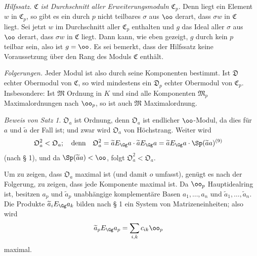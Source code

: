 \medskip
\noindent\emph{Hilfssatz. $\mathfrak C$ ist Durchschnitt aller Erweiterungsmoduln $\mathfrak C_p$.} Denn liegt ein Element $w$ in $\mathfrak C_p$, so gibt es ein durch $p$ nicht teilbares $\sigma$ aus $\oo$ derart, dass $\sigma w$ in $\mathfrak C$ liegt. Sei jetzt $w$ im Durchschnitt aller $\mathfrak C_p$ enthalten und $g$ das Ideal aller $\sigma$ aus $\oo$ derart, dass $\sigma w$ in $\mathfrak C$ liegt. Dann kann, wie eben gezeigt, $g$ durch kein $p$ teilbar sein, also ist $g=\oo$. Es sei bemerkt, dass der Hilfssatz keine Voraussetzung über den Rang des Moduls $\mathfrak C$ enthält.

\emph{Folgerungen.} Jeder Modul ist also durch seine Komponenten bestimmt. Ist $\mathfrak D$ echter Obermodul von $\mathfrak C$, so wird mindestens ein $\mathfrak D_p$ echter Obermodul von $\mathfrak C_p$. Insbesondere: Ist $\mathfrak M$ Ordnung in $K$ und sind alle Komponenten $\mathfrak M_p$ Maximalordnungen nach $\oo_p$, so ist auch $\mathfrak M$ Maximalordnung.

\medskip
\noindent\emph{Beweis von Satz 1.} $\mathfrak O_a$ ist Ordnung, denn $\mathfrak O_a$ ist endlicher $\oo$-Modul, da dies für $a$ und $\widetilde a$ der Fall ist; und zwar wird $\mathfrak O_a$ von Höchstrang. Weiter wird
\[
\mathfrak O_a^2<\mathfrak O_a;
\quad\text{denn}\quad
\mathfrak O_a^2
 =\widetilde aE_\Gg a\cdot\widetilde aE_\Gg a
 =\widetilde aE_\Gg a\cdot\Sp(\widetilde a a)\text{\textsuperscript{(9)}}
\]
(nach § 1), und da $\Sp(\widetilde a a)<\oo$, folgt $\mathfrak O_a^2<\mathfrak O_a$.

Um zu zeigen, dass $\mathfrak O_a$ maximal ist (und damit $o$ umfasst), genügt es nach der Folgerung, zu zeigen, dass jede Komponente maximal ist. Da $\oo_p$ Hauptidealring ist, besitzen $a_p$ und $\widetilde a_p$ unabhängige komplementäre Basen $a_1,\ldots,a_n$ und $\widetilde a_1,\ldots,\widetilde a_n$. Die Produkte $\widetilde a_iE_\Gg a_k$ bilden nach § 1 ein System von Matrizeneinheiten; also wird
\[
\widetilde a_pE_\Gg a_p=\sum_{i,k}c_{ik}\oo_p
\]
maximal.

